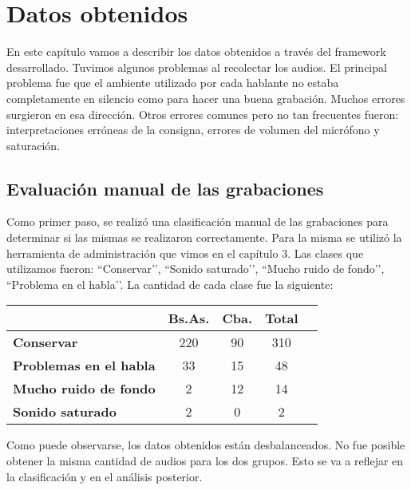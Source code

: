 \chapter{Datos obtenidos}

En este capítulo vamos a describir los datos obtenidos a través del framework desarrollado. Tuvimos algunos problemas al recolectar los audios. El principal problema fue que el ambiente utilizado por cada hablante no estaba completamente en silencio como para hacer una buena grabación. Muchos errores surgieron en esa dirección. Otros errores comunes pero no tan frecuentes fueron: interpretaciones erróneas de la consigna, errores de volumen del micrófono y saturación. 

\section{Evaluación manual de las grabaciones}

Como primer paso, se realizó una clasificación manual de las grabaciones para determinar si las mismas se realizaron correctamente. Para la misma se utilizó la herramienta de administración que vimos en el capítulo 3. Las clases que utilizamos fueron: ``Conservar’’, ``Sonido saturado’’, ``Mucho ruido de fondo’’, ``Problema en el habla’’. La cantidad de cada clase fue la siguiente:

\begin{table}[h]
\centering
\begin{tabular}{|l|c|c|c|c|}
\hline
\textbf{}  & \textbf{Bs.As. } & \textbf{Cba.} & \textbf{Total} \\ \hline
\textbf{Conservar}  & 220 & 90 & 310 \\ \hline
\textbf{Problemas en el habla}  & 33 & 15 & 48 \\ \hline
\textbf{Mucho ruido de fondo}  & 2 & 12 & 14 \\ \hline
\textbf{Sonido saturado}  & 2 & 0 & 2 \\ \hline
\end{tabular}
\end{table}

Como puede observarse, los datos obtenidos están desbalanceados. No fue posible obtener la misma cantidad de audios para los dos grupos. Esto se va a reflejar en la clasificación y en el análisis posterior.


